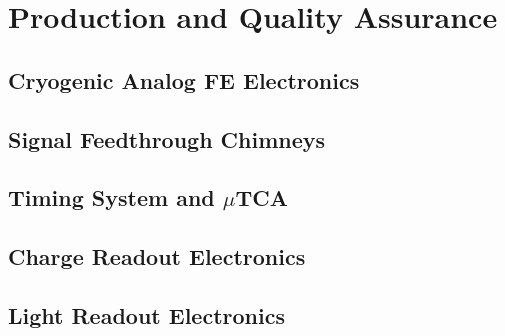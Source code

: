 \section{Production and Quality Assurance}
\label{sec:dp-tpcelec-production}

\subsection{Cryogenic Analog FE Electronics}
\label{ssec:dp-tpcelec-prod-cryofe}

\subsection{Signal Feedthrough Chimneys}
\label{ssec:dp-tpcelec-prod-sft}

\subsection{Timing System and $\mu$TCA}
\label{ssec:dp-tpcelec-prod-utca}

\subsection{Charge Readout Electronics}
\label{ssec:dp-tpcelec-prod-cro}

\subsection{Light Readout Electronics}
\label{ssec:dp-tpcelec-prod-lro}

